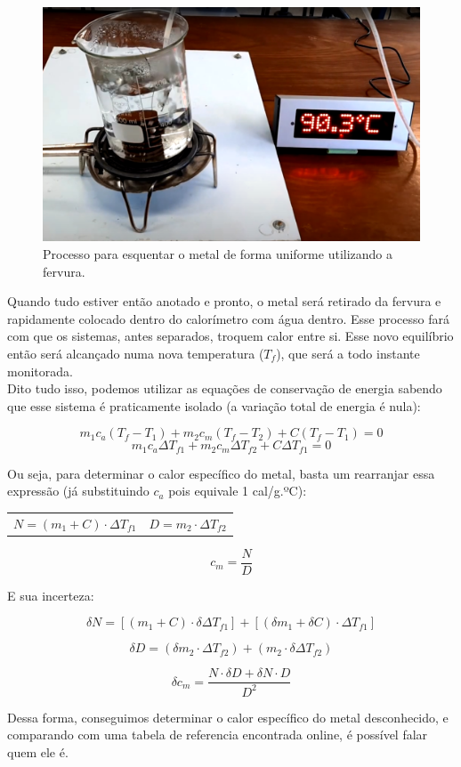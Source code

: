 \begin{figure}[H]
  \centering
  \includegraphics[scale=0.3]{images/fervura-dagua.png}
  \caption{Processo para esquentar o metal de forma uniforme utilizando a fervura.}
\end{figure}

Quando tudo estiver então anotado e pronto, o metal será retirado da fervura e rapidamente colocado dentro do calorímetro com água dentro. Esse processo fará com que os sistemas, antes separados, troquem calor entre si. Esse novo equilíbrio então será alcançado numa nova temperatura ($T_f$), que será a todo instante monitorada.\\

Dito tudo isso, podemos utilizar as equações de conservação de energia sabendo que esse sistema é praticamente isolado (a variação total de energia é nula):

\[ m_1 c_a (T_f - T_1) + m_2 c_m (T_f - T_2) + C (T_f - T_1) = 0 \]
\[ m_1 c_a \Delta T_{f1} + m_2 c_m \Delta T_{f2} + C \Delta T_{f1} = 0 \]

Ou seja, para determinar o calor específico do metal, basta um rearranjar essa expressão (já substituindo $c_a$ pois equivale 1 cal/g.ºC):

\begin{table}[H]
    \centering
    \begin{tabular}{ c||c  }
         $N = (m_1 + C) \cdot \Delta T_{f1}$ &
         $D = m_2 \cdot \Delta T_{f2}$
    \end{tabular}
\end{table}

\[ c_m = \frac{N}{D} \]

E sua incerteza:

\[ \delta N = [(m_1 + C) \cdot \delta \Delta T_{f1}] + [(\delta m_1 + \delta C) \cdot \Delta T_{f1}] \]

\[ \delta D = (\delta m_2 \cdot \Delta T_{f2}) + (m_2 \cdot \delta \Delta T_{f2}) \]

\[ \delta c_m = \frac{N \cdot \delta D + \delta N \cdot D}{D^2} \]

Dessa forma, conseguimos determinar o calor específico do metal desconhecido, e comparando com uma tabela de referencia encontrada online, é possível falar quem ele é.
